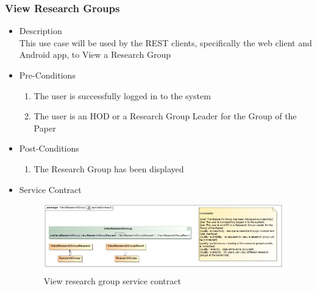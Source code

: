 \documentclass[a4paper,10pt]{article}
\begin{document}
	\subsubsection{View Research Groups}
	\begin{itemize}
		\item Description\\
		This use case will be used by the REST clients, specifically the web client and Android app, to View a Research Group
		\item Pre-Conditions
		\begin{enumerate}
			\item The user is successfully logged in to the system
			\item The user is an HOD or a Research Group Leader for the Group of the Paper
		\end{enumerate}
		\item Post-Conditions
		\begin{enumerate}
			\item The Research Group has been displayed
			
		\end{enumerate}
		\item Service Contract
		\begin{figure}[H]
			\includegraphics[scale=0.5]{ViewResearchGroupServiceContract}
			\caption{View research group service contract}
		\end{figure}
	\end{itemize}
\end{document}
